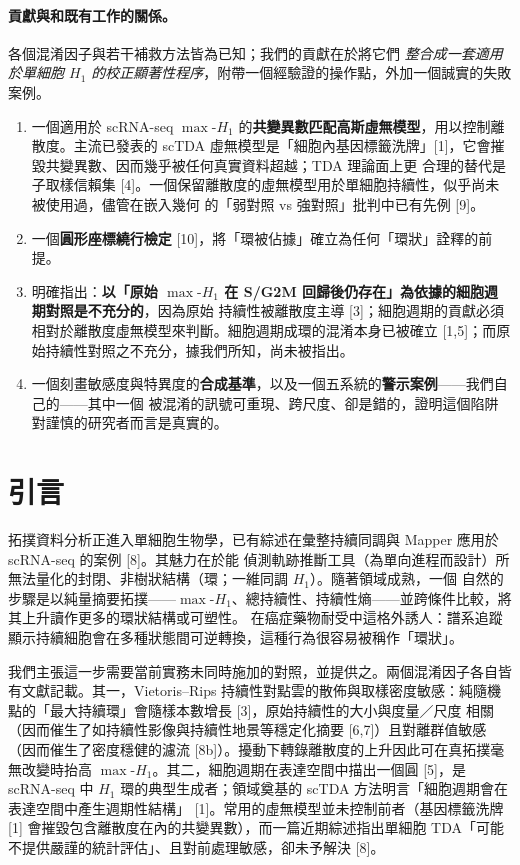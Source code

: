 \documentclass[11pt,a4paper]{article}
\newcommand{\maxh}{\ensuremath{\max\text{-}H_1}}
\begin{document}
\paragraph{貢獻與和既有工作的關係。} 各個混淆因子與若干補救方法皆為已知；我們的貢獻在於將它們
\emph{整合成一套適用於單細胞 $H_1$ 的校正顯著性程序}，附帶一個經驗證的操作點，外加一個誠實的失敗案例。
\begin{enumerate}[leftmargin=1.4em,itemsep=1pt]
\item 一個適用於 scRNA-seq \maxh{} 的\textbf{共變異數匹配高斯虛無模型}，用以控制離散度。主流已發表的
scTDA 虛無模型是「細胞內基因標籤洗牌」[1]，它會摧毀共變異數、因而幾乎被任何真實資料超越；TDA 理論面上更
合理的替代是子取樣信賴集 [4]。一個保留離散度的虛無模型用於單細胞持續性，似乎尚未被使用過，儘管在嵌入幾何
的「弱對照 vs 強對照」批判中已有先例 [9]。
\item 一個\textbf{圓形座標繞行檢定} [10]，將「環被佔據」確立為任何「環狀」詮釋的前提。
\item 明確指出：\textbf{以「原始 \maxh{} 在 S/G2M 回歸後仍存在」為依據的細胞週期對照是不充分的}，因為原始
持續性被離散度主導 [3]；細胞週期的貢獻必須相對於離散度虛無模型來判斷。細胞週期成環的混淆本身已被確立
[1,5]；而原始持續性對照之不充分，據我們所知，尚未被指出。
\item 一個刻畫敏感度與特異度的\textbf{合成基準}，以及一個五系統的\textbf{警示案例}——我們自己的——其中一個
被混淆的訊號可重現、跨尺度、卻是錯的，證明這個陷阱對謹慎的研究者而言是真實的。
\end{enumerate}

\section{引言}
拓撲資料分析正進入單細胞生物學，已有綜述在彙整持續同調與 Mapper 應用於 scRNA-seq 的案例 [8]。其魅力在於能
偵測軌跡推斷工具（為單向進程而設計）所無法量化的封閉、非樹狀結構（環；一維同調 $H_1$）。隨著領域成熟，一個
自然的步驟是以純量摘要拓撲——\maxh、總持續性、持續性熵——並跨條件比較，將其上升讀作更多的環狀結構或可塑性。
在癌症藥物耐受中這格外誘人：譜系追蹤顯示持續細胞會在多種狀態間可逆轉換，這種行為很容易被稱作「環狀」。

我們主張這一步需要當前實務未同時施加的對照，並提供之。兩個混淆因子各自皆有文獻記載。其一，Vietoris--Rips
持續性對點雲的散佈與取樣密度敏感：純隨機點的「最大持續環」會隨樣本數增長 [3]，原始持續性的大小與度量／尺度
相關（因而催生了如持續性影像與持續性地景等穩定化摘要 [6,7]）且對離群值敏感（因而催生了密度穩健的濾流
[8b]）。擾動下轉錄離散度的上升因此可在真拓撲毫無改變時抬高 \maxh。其二，細胞週期在表達空間中描出一個圓
[5]，是 scRNA-seq 中 $H_1$ 環的典型生成者；領域奠基的 scTDA 方法明言「細胞週期會在表達空間中產生週期性結構」
[1]。常用的虛無模型並未控制前者（基因標籤洗牌 [1] 會摧毀包含離散度在內的共變異數），而一篇近期綜述指出單細胞
TDA「可能不提供嚴謹的統計評估」、且對前處理敏感，卻未予解決 [8]。
\end{document}

